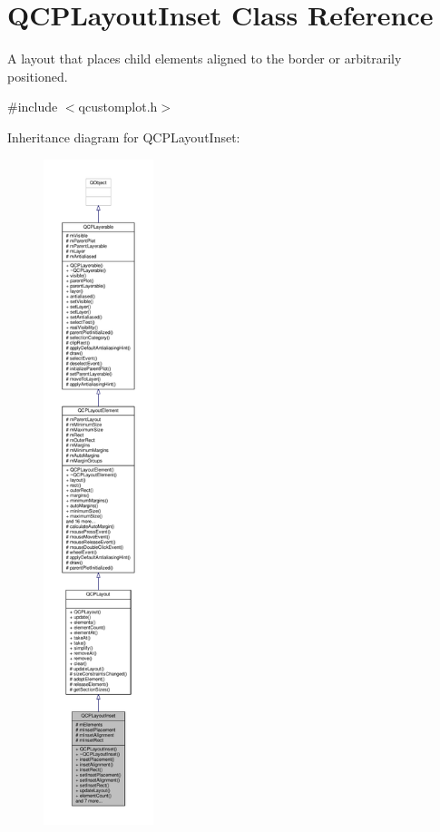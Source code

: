 \hypertarget{class_q_c_p_layout_inset}{}\section{Q\+C\+P\+Layout\+Inset Class Reference}
\label{class_q_c_p_layout_inset}


A layout that places child elements aligned to the border or arbitrarily positioned.  




{\ttfamily \#include $<$qcustomplot.\+h$>$}



Inheritance diagram for Q\+C\+P\+Layout\+Inset\+:\nopagebreak
\begin{figure}[H]
\begin{center}
\leavevmode
\includegraphics[height=550pt]{class_q_c_p_layout_inset__inherit__graph}
\end{center}
\end{figure}


